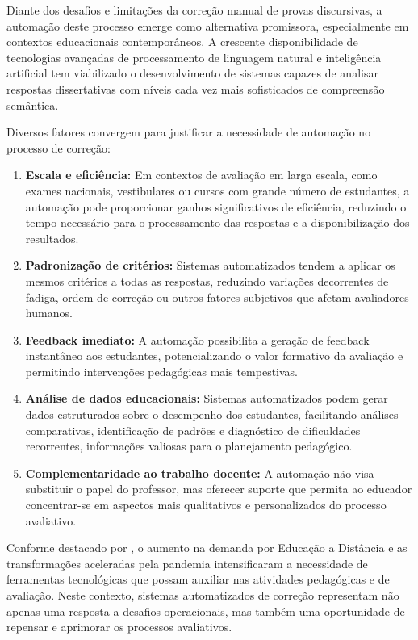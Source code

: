 Diante dos desafios e limitações da correção manual de provas discursivas, a automação deste processo emerge como alternativa promissora, especialmente em contextos educacionais contemporâneos. A crescente disponibilidade de tecnologias avançadas de processamento de linguagem natural e inteligência artificial tem viabilizado o desenvolvimento de sistemas capazes de analisar respostas dissertativas com níveis cada vez mais sofisticados de compreensão semântica.

Diversos fatores convergem para justificar a necessidade de automação no processo de correção:

\begin{enumerate}
    \item  \textbf{Escala e eficiência:} Em contextos de avaliação em larga escala, como exames nacionais, vestibulares ou cursos com grande número de estudantes, a automação pode proporcionar ganhos significativos de eficiência, reduzindo o tempo necessário para o processamento das respostas e a disponibilização dos resultados.
    
  \item  \textbf{Padronização de critérios:} Sistemas automatizados tendem a aplicar os mesmos critérios a todas as respostas, reduzindo variações decorrentes de fadiga, ordem de correção ou outros fatores subjetivos que afetam avaliadores humanos.
    
    \item  \textbf{Feedback imediato:} A automação possibilita a geração de feedback instantâneo aos estudantes, potencializando o valor formativo da avaliação e permitindo intervenções pedagógicas mais tempestivas.
    
    \item  \textbf{Análise de dados educacionais:} Sistemas automatizados podem gerar dados estruturados sobre o desempenho dos estudantes, facilitando análises comparativas, identificação de padrões e diagnóstico de dificuldades recorrentes, informações valiosas para o planejamento pedagógico.
    
    \item  \textbf{Complementaridade ao trabalho docente:} A automação não visa substituir o papel do professor, mas oferecer suporte que permita ao educador concentrar-se em aspectos mais qualitativos e personalizados do processo avaliativo.
\end{enumerate}

Conforme destacado por , o aumento na demanda por Educação a Distância e as transformações aceleradas pela pandemia intensificaram a necessidade de ferramentas tecnológicas que possam auxiliar nas atividades pedagógicas e de avaliação. Neste contexto, sistemas automatizados de correção representam não apenas uma resposta a desafios operacionais, mas também uma oportunidade de repensar e aprimorar os processos avaliativos.

